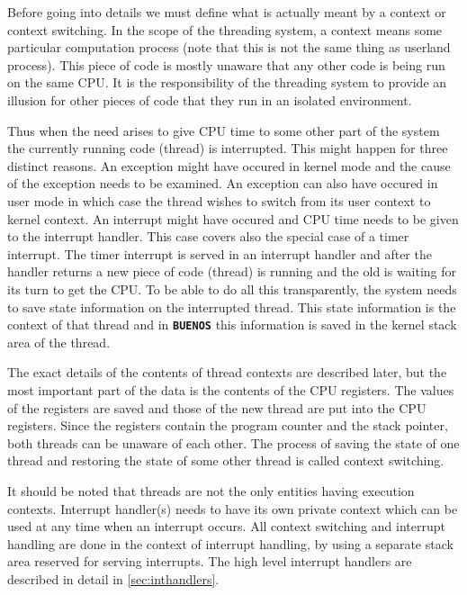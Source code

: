 \documentclass[twoside,a4paper]{report}
\newcommand{\buenos}{\texttt{\textbf{BUENOS}}}
\begin{document}
Before going into details we must define what is actually meant by a
context or context switching. In the scope of the threading system, a
context means some particular computation process (note that this is
not the same thing as userland process). This piece of code is mostly
unaware that any other code is being run on the same CPU. It is the
responsibility of the threading system to provide an illusion for
other pieces of code that they run in an isolated environment.

Thus when the need arises to give CPU time to some other part of the
system the currently running code (thread) is interrupted. This might
happen for three distinct reasons. An exception might have occured in
kernel mode and the cause of the exception needs to be examined. An
exception can also have occured in user mode in which case the thread
wishes to switch from its user context to kernel context. An interrupt
might have occured and CPU time needs to be given to the interrupt
handler. This case covers also the special case of a timer interrupt.
The timer interrupt is served in an interrupt handler and after the
handler returns a new piece of code (thread) is running and the old is
waiting for its turn to get the CPU. To be able to do all this
transparently, the system needs to save state information on the
interrupted thread. This state information is the context of that
thread and in \buenos{} this information is saved in the kernel stack
area of the thread.

The exact details of the contents of thread contexts are described
later, but the most important part of the data is the contents of the
CPU registers. The values of the registers are saved and those of the
new thread are put into the CPU registers. Since the registers contain
the program counter and the stack pointer, both threads can be unaware of
each other. The process of saving the state of one thread and
restoring the state of some other thread is called context switching.

It should be noted that threads are not the only entities having
execution contexts. Interrupt handler(s) needs to have its own private
context which can be used at any time when an interrupt occurs. All
context switching and interrupt handling are done in the context of
interrupt handling, by using a separate stack area reserved for
serving interrupts. The high level interrupt handlers are described in
detail in \autoref{sec:inthandlers}.
\end{document}
